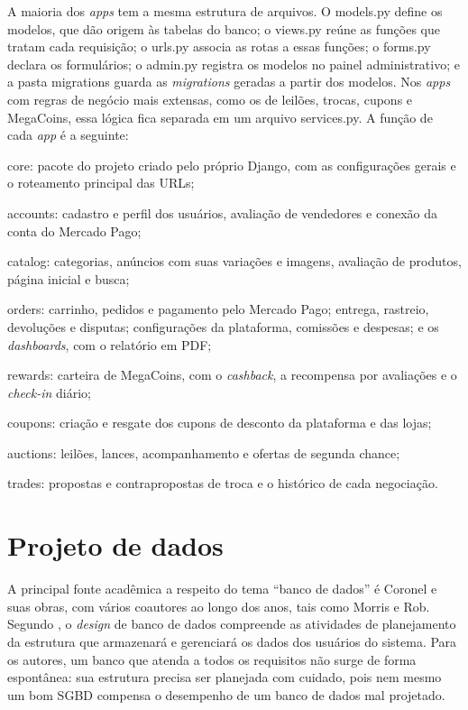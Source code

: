 \documentclass[
  12pt,
  a4paper,
  oneside,
  chapter=TITLE,
  subsection=TITLE,
  sumario=abnt-6027-2012,
  english,
  brazil
]{abntex2}
\begin{document}
A maioria dos \emph{apps} tem a mesma estrutura de arquivos. O
models.py define os modelos, que dão origem às tabelas do banco; o
views.py reúne as funções que tratam cada requisição; o urls.py associa
as rotas a essas funções; o forms.py declara os formulários; o admin.py
registra os modelos no painel administrativo; e a pasta migrations
guarda as \emph{migrations} geradas a partir dos modelos. Nos \emph{apps}
com regras de negócio mais extensas, como os de leilões, trocas, cupons
e MegaCoins, essa lógica fica separada em um arquivo services.py. A
função de cada \emph{app} é a seguinte:

\begin{alineas}
  \item core: pacote do projeto criado pelo próprio Django, com as
  configurações gerais e o roteamento principal das URLs;
  \item accounts: cadastro e perfil dos usuários, avaliação de
  vendedores e conexão da conta do Mercado Pago;
  \item catalog: categorias, anúncios com suas variações e imagens,
  avaliação de produtos, página inicial e busca;
  \item orders: carrinho, pedidos e pagamento pelo Mercado Pago; entrega,
  rastreio, devoluções e disputas; configurações da plataforma,
  comissões e despesas; e os \emph{dashboards}, com o relatório em PDF;
  \item rewards: carteira de MegaCoins, com o \emph{cashback}, a
  recompensa por avaliações e o \emph{check-in} diário;
  \item coupons: criação e resgate dos cupons de desconto da plataforma e
  das lojas;
  \item auctions: leilões, lances, acompanhamento e ofertas de segunda
  chance;
  \item trades: propostas e contrapropostas de troca e o histórico de
  cada negociação.
\end{alineas}

\section{Projeto de dados}

A principal fonte acadêmica a respeito do tema ``banco de dados'' é
Coronel e suas obras, com vários coautores ao longo dos anos, tais como
Morris e Rob. Segundo , o \emph{design}
de banco de dados compreende as atividades de planejamento da estrutura
que armazenará e gerenciará os dados dos usuários do sistema. Para os
autores, um banco que atenda a todos os requisitos não surge de forma
espontânea: sua estrutura precisa ser planejada com cuidado, pois nem
mesmo um bom SGBD compensa o desempenho de um banco de dados mal
projetado.
\end{document}
